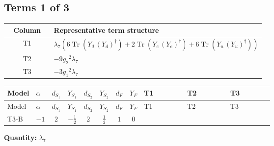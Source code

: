 \documentclass[8pt]{article}
\begin{document}
\begin{landscape}
\subsection*{Terms 1 of 3}
\begin{center}
\begin{tabular}{@{}c >{\raggedright\arraybackslash}p{0.82\linewidth}@{}}
\toprule
Column & Representative term structure \\
\midrule
T1 & \(\displaystyle {\lambda_{7}} (6 \operatorname{Tr}\!\left({Y_d}\,\left({Y_d}\right)^{\dagger}\right)+2 \operatorname{Tr}\!\left({Y_e}\,\left({Y_e}\right)^{\dagger}\right)+6 \operatorname{Tr}\!\left({Y_u}\,\left({Y_u}\right)^{\dagger}\right))\) \\
\midrule
T2 & \(\displaystyle -9 {g_2}^2 {\lambda_{7}}\) \\
\midrule
T3 & \(\displaystyle -3 {g_1}^2 {\lambda_{7}}\) \\
\midrule
\bottomrule
\end{tabular}
\end{center}
\smallskip
\tiny
\begin{longtable}{@{}llcccccc >{\raggedright\arraybackslash}p{0.21\linewidth} >{\raggedright\arraybackslash}p{0.21\linewidth} >{\raggedright\arraybackslash}p{0.21\linewidth}@{}}
\toprule
Model & $\alpha$ & $d_{S_1}$ & $Y_{S_1}$ & $d_{S_2}$ & $Y_{S_2}$ & $d_F$ & $Y_F$ & T1 & T2 & T3 \\
\midrule
\endfirsthead
\toprule
Model & $\alpha$ & $d_{S_1}$ & $Y_{S_1}$ & $d_{S_2}$ & $Y_{S_2}$ & $d_F$ & $Y_F$ & T1 & T2 & T3 \\
\midrule
\endhead
T3-B & $-1$ & $2$ & $-\frac{1}{2}$ & $2$ & $\frac{1}{2}$ & $1$ & $0$ & \scriptsize\adjustbox{max width=\linewidth}{$\begin{gathered} {\lambda_{7}} (6 \operatorname{Tr}\!\left({Y_d}\,\left({Y_d}\right)^{\dagger}\right)+2 \operatorname{Tr}\!\left({Y_e}\,\left({Y_e}\right)^{\dagger}\right)+6 \operatorname{Tr}\!\left({Y_u}\,\left({Y_u}\right)^{\dagger}\right))\end{gathered}$} & \scriptsize\adjustbox{max width=\linewidth}{$\begin{gathered} -9 {g_2}^2 {\lambda_{7}}\end{gathered}$} & \scriptsize\adjustbox{max width=\linewidth}{$\begin{gathered} -3 {g_1}^2 {\lambda_{7}}\end{gathered}$} \\
\midrule
\bottomrule
\end{longtable}
\clearpage
\noindent\textbf{Quantity: }$\lambda_{7}$\par\smallskip

\end{landscape}
\end{document}
